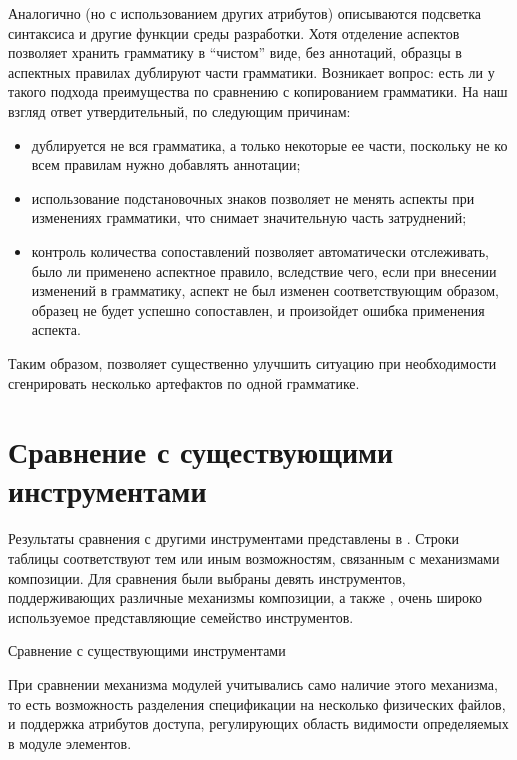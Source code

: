 Аналогично (но с использованием других атрибутов) описываются подсветка синтаксиса и другие функции среды разработки. Хотя отделение аспектов позволяет хранить грамматику в ``чистом'' виде, без аннотаций, образцы в аспектных правилах дублируют части грамматики. Возникает вопрос: есть ли у такого подхода преимущества по сравнению с копированием грамматики. На наш взгляд ответ утвердительный, по следующим причинам:
\begin{itemize}
\item дублируется не вся грамматика, а только некоторые ее части, поскольку не ко всем правилам нужно добавлять аннотации;
\item использование подстановочных знаков позволяет не менять аспекты при изменениях грамматики, что снимает значительную часть затруднений;
\item контроль количества сопоставлений позволяет автоматически отслеживать, было ли применено аспектное правило, вследствие чего, если при внесении изменений в грамматику, аспект не был изменен соответствующим образом, образец не будет успешно сопоставлен, и произойдет ошибка применения аспекта.
\end{itemize}
Таким образом, \GRM{} позволяет существенно улучшить ситуацию при необходимости сгенрировать несколько артефактов по одной грамматике.

\chapter{Сравнение с существующими инструментами}

Результаты сравнения \GRM{} с другими инструментами представлены в . Строки таблицы соответствуют тем или иным возможностям, связанным с механизмами композиции. Для сравнения были выбраны девять инструментов, поддерживающих различные механизмы композиции, а также , очень широко используемое представляющие семейство инструментов.

\begin{table}[htb]
	\centering
\newcommand{\dissonly}[1]{#1}

	\caption{Сравнение \GRM{} с существующими инструментами}\label{GrmTable}
\end{table}

При сравнении механизма модулей учитывались само наличие этого механизма, то есть возможность разделения спецификации на несколько физических файлов, и поддержка атрибутов доступа, регулирующих область видимости определяемых в модуле элементов.

